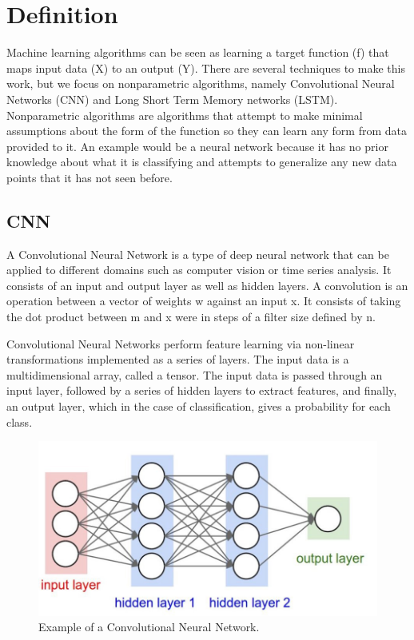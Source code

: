 \documentclass{turabian-thesis}
\newcounter{case}[section]
\begin{document}
\section{Definition}
Machine learning algorithms can be seen as learning a target function (f) that maps input data (X) to an output (Y). There are several techniques to make this work, but we focus on nonparametric algorithms, namely Convolutional Neural Networks (CNN) and Long Short Term Memory networks (LSTM). Nonparametric algorithms are algorithms that attempt to make minimal assumptions about the form of the function so they can learn any form from data provided to it. An example would be a neural network because it has no prior knowledge about what it is classifying and attempts to generalize any new data points that it has not seen before.

\subsection{CNN}

A Convolutional Neural Network is a type of deep neural network that can be applied to different domains such as computer vision or time series analysis. It consists of an input and output layer as well as hidden layers. A convolution is an operation between a vector of weights w against an input x. It consists of taking the dot product between m and x were in steps of a filter size defined by n.

Convolutional Neural Networks perform feature learning via non-linear transformations implemented as a series of layers. The input data is a multidimensional array, called a tensor. The input data is passed through an input layer, followed by a series of hidden layers to extract features, and finally, an output layer, which in the case of classification, gives a probability for each class. 

\begin{figure}[h!]
   \begin{center}
      \includegraphics[scale=0.3]{../media/nn_highlight.jpeg}
   \end{center}
   \caption{Example of a Convolutional Neural Network.}
   \label{fig:reinforcementAgent}
\end{figure}
\end{document}
